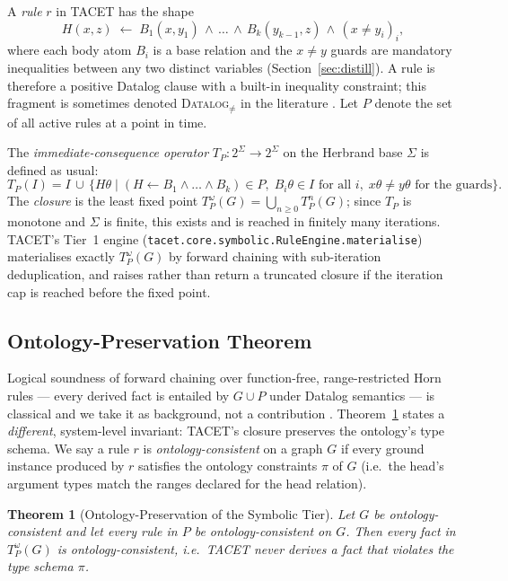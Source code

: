 \documentclass[11pt]{article}
\theoremstyle{plain}
\newtheorem{theorem}{Theorem}
\begin{document}
A \emph{rule} $r$ in TACET has the shape
\[
H(x, z) \;\leftarrow\; B_1(x, y_1) \,\wedge\, \dots \,\wedge\,
B_k(y_{k-1}, z) \,\wedge\, (x \neq y_i)_{i},
\]
where each body atom $B_i$ is a base relation and the
$x \neq y$ guards are mandatory inequalities between any two distinct
variables (Section~\ref{sec:distill}).  A rule is therefore
a positive Datalog clause with a built-in inequality constraint;
this fragment is sometimes denoted \textsc{Datalog}$_\neq$ in the
literature \cite{calvanese2013data}.  Let $P$ denote the set of all
active rules at a point in time.

The \emph{immediate-consequence operator}
$T_P : 2^\Sigma \to 2^\Sigma$ on the Herbrand base $\Sigma$ is
defined as usual:
\[
T_P(I) = I \,\cup\, \{ H\theta \;|\; (H \leftarrow B_1 \wedge \dots
\wedge B_k) \in P,\; B_i\theta \in I \text{ for all } i,\;
x\theta \neq y\theta \text{ for the guards} \}.
\]
The \emph{closure} is the least fixed point
$T_P^{\omega}(G) = \bigcup_{n \ge 0} T_P^n(G)$; since $T_P$ is monotone
and $\Sigma$ is finite, this exists and is reached in finitely many
iterations.  TACET's Tier~1 engine
(\texttt{tacet.core.symbolic.RuleEngine.materialise})
materialises exactly $T_P^{\omega}(G)$ by forward chaining with
sub-iteration deduplication, and raises rather than return a truncated
closure if the iteration cap is reached before the fixed point.

\subsection{Ontology-Preservation Theorem}
\label{sec:soundness-thm}

Logical soundness of forward chaining over function-free,
range-restricted Horn rules --- every derived fact is entailed by
$G \cup P$ under Datalog semantics --- is classical and we take it as
background, not a contribution
\cite{abiteboul1995foundations}.  Theorem~\ref{thm:soundness} states a
\emph{different}, system-level invariant: TACET's closure preserves the
ontology's type schema.  We say a rule $r$ is \emph{ontology-consistent}
on a graph $G$ if every ground instance produced by $r$ satisfies the
ontology constraints $\pi$ of $G$ (i.e.\ the head's argument types match
the ranges declared for the head relation).

\begin{theorem}[Ontology-Preservation of the Symbolic Tier]
\label{thm:soundness}
Let $G$ be ontology-consistent and let every rule in $P$ be
ontology-consistent on $G$.  Then every fact in $T_P^{\omega}(G)$ is
ontology-consistent, i.e.\ TACET never derives a fact that violates the
type schema $\pi$.
\end{theorem}
\end{document}
